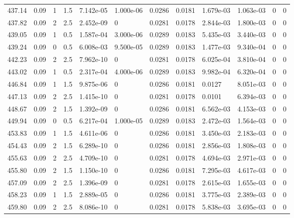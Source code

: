 \documentclass[preview]{standalone}
\begin{document}
{{{{{{{\begin{tabular}{L{1.2cm}C{1.2cm} C{0.3cm}C{0.5cm} C{1.4cm}C{1.4cm} C{1.4cm}C{1.4cm} C{1.6cm}C{1.6cm} C{1.6cm}C{1.6cm}}
  437.14  &  0.09  & 1     & 1.5 &  7.142e-05  & 1.000e-06  &  0.0286&   0.0181& 1.679e-03 & 1.063e-03   &  0 & 0  \\ 
  437.82  &  0.09  & 2     & 2.5 &  2.452e-09  & 0  &  0.0281&   0.0178& 2.844e-03 & 1.800e-03   &  0 & 0  \\ 
  439.05  &  0.09  & 1     & 0.5 &  1.587e-04  & 3.000e-06  &  0.0289&   0.0183& 5.435e-03 & 3.440e-03   &  0 & 0  \\ 
  439.24  &  0.09  & 0     & 0.5 &  6.008e-03  & 9.500e-05  &  0.0289&   0.0183& 1.477e-03 & 9.340e-04   &  0 & 0  \\ 
  442.23  &  0.09  & 2     & 2.5 &  7.962e-10  & 0  &  0.0281&   0.0178& 6.025e-04 & 3.810e-04   &  0 & 0  \\ 
  443.02  &  0.09  & 1     & 0.5 &  2.317e-04  & 4.000e-06  &  0.0289&   0.0183& 9.982e-04 & 6.320e-04   &  0 & 0  \\ 
  446.84  &  0.09  & 1     & 1.5 &  9.875e-06  & 0  &  0.0286&   0.0181& 0.0127 & 8.051e-03   &  0 & 0  \\ 
  447.13  &  0.09  & 2     & 2.5 &  1.415e-10  & 0  &  0.0281&   0.0178& 0.0101 & 6.394e-03   &  0 & 0  \\ 
  448.67  &  0.09  & 2     & 1.5 &  1.392e-09  & 0  &  0.0286&   0.0181& 6.562e-03 & 4.153e-03   &  0 & 0  \\ 
  449.94  &  0.09  & 0     & 0.5 &  6.217e-04  & 1.000e-05  &  0.0289&   0.0183& 2.472e-03 & 1.564e-03   &  0 & 0  \\ 
  453.83  &  0.09  & 1     & 1.5 &  4.611e-06  & 0  &  0.0286&   0.0181& 3.450e-03 & 2.183e-03   &  0 & 0  \\ 
  454.43  &  0.09  & 2     & 1.5 &  6.289e-10  & 0  &  0.0286&   0.0181& 2.856e-03 & 1.808e-03   &  0 & 0  \\ 
  455.63  &  0.09  & 2     & 2.5 &  4.709e-10  & 0  &  0.0281&   0.0178& 4.694e-03 & 2.971e-03   &  0 & 0  \\ 
  455.80  &  0.09  & 2     & 1.5 &  1.150e-10  & 0  &  0.0286&   0.0181& 7.295e-03 & 4.617e-03   &  0 & 0  \\ 
  457.09  &  0.09  & 2     & 2.5 &  1.396e-09  & 0  &  0.0281&   0.0178& 2.615e-03 & 1.655e-03   &  0 & 0  \\ 
  458.23  &  0.09  & 1     & 1.5 &  2.889e-05  & 0  &  0.0286&   0.0181& 3.775e-03 & 2.389e-03   &  0 & 0  \\ 
  459.80  &  0.09  & 2     & 2.5 &  8.086e-10  & 0  &  0.0281&   0.0178& 5.838e-03 & 3.695e-03   &  0 & 0  \\ 

\end{tabular}}}}}}}}
\end{document}
